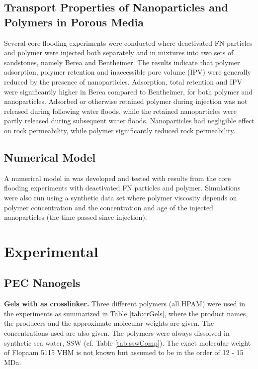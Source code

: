 \documentclass[journal = enfuem, manuscript =  article]{achemso}
\begin{document}
\subsection{Transport Properties of Nanoparticles and Polymers in Porous Media}
Several core flooding experiments were conducted where deactivated FN particles and polymer were injected both separately and in mixtures into two sets of sandstones, namely Berea and Bentheimer. The results indicate that polymer adsorption, polymer retention and inaccessible pore volume  (IPV) were generally reduced by the presence of nanoparticles. Adsorption, total retention and IPV were significantly higher in Berea compared to Bentheimer, for both polymer and nanoparticles. Adsorbed or otherwise retained polymer during injection was not released during following water floods, while the retained nanoparticles were partly released during subsequent water floods. Nanoparticles had negligible effect on rock permeability, while polymer significantly reduced rock permeability.

\subsection{Numerical Model}
A numerical model in was developed and tested with results from the core flooding experiments with deactivated FN particles and polymer. Simulations were also run using a synthetic data set where polymer viscosity depends on polymer concentration and the concentration and age of the injected nanoparticles (the time passed since injection).

\section{Experimental}
\subsection{PEC Nanogels}
\textbf{Gels with  as crosslinker.}
Three different polymers (all HPAM) were used in the experiments as summarized in Table \ref{tab:crGels}, where the product names, the producers and the approximate molecular weights are given. The concentrations used are also given. The polymers were always dissolved in synthetic sea water, SSW (cf. Table \ref{tab:sswComp}). The exact molecular weight of Flopaam 5115 VHM is not known but assumed to be in the order of 12 - 15 MDa.
\end{document}
